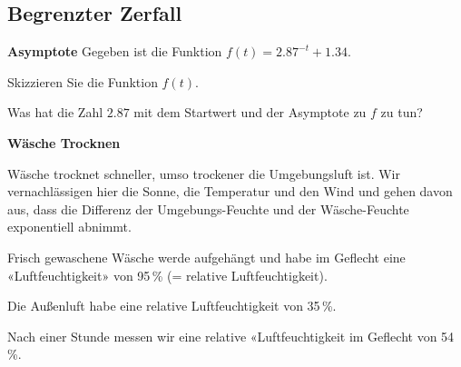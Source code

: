 
\subsection{Begrenzter Zerfall}

\bbwActAufgabenNr{} \textbf{Asymptote}
Gegeben ist die Funktion $f(t) = 2.87^{-t} + 1.34$.
\begin{bbwAufgabenBlock}
\item
  Skizzieren Sie die Funktion $f(t)$.
  

  
\item
{}%

  \item Was hat die Zahl $2.87$ mit dem Startwert und der Asymptote zu
    $f$ zu tun? 
\end{bbwAufgabenBlock}

\noTRAINER{}

\platzFuerBerechnungenBisEndeSeite{}



\bbwActAufgabenNr{} \textbf{Wäsche Trocknen}

Wäsche trocknet schneller, umso trockener die Umgebungsluft ist. Wir
vernachlässigen hier die Sonne, die Temperatur und den Wind und gehen
davon aus, dass die Differenz der Umgebungs-Feuchte und der
Wäsche-Feuchte exponentiell abnimmt.

Frisch gewaschene Wäsche werde aufgehängt und habe im Geflecht eine «Luftfeuchtigkeit» von 95\,\%
(= relative Luftfeuchtigkeit).

Die Außenluft habe eine relative Luftfeuchtigkeit von 35\,\%. 


Nach einer
Stunde messen wir eine relative «Luftfeuchtigkeit im Geflecht von
54\,\%.


